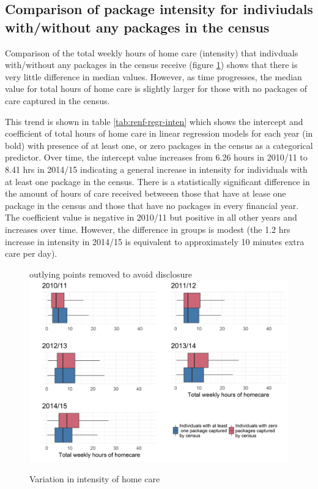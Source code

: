 \documentclass[]{article}
\begin{document}
\subsection{Comparison of package intensity for indiviudals with/without any packages in the census}\label{subsec:renf-inten-diff}

Comparison of the total weekly hours of home care (intensity) that
indivduals with/without any packages in the census receive (figure
\ref{fig:renf-inten}) shows that there is very little difference in
median values. However, as time progresses, the median value for total
hours of home care is slightly larger for those with no packages of care
captured in the census.

This trend is shown in table \ref{tab:renf-regr-inten} which shows the
intercept and coefficient of total hours of home care in linear
regression models for each year (in bold) with presence of at least one,
or zero packages in the census as a categorical predictor. Over time,
the intercept value increases from 6.26 hours in 2010/11 to 8.41 hrs in
2014/15 indicating a general increase in intensity for individuals with
at least one package in the census. There is a statistically significant
difference in the amount of hours of care received betweeen those that
have at lease one package in the census and those that have no packages
in every financial year. The coefficient value is negative in 2010/11
but positive in all other years and increases over time. However, the
difference in groups is modest (the 1.2 hrs increase in intensity in
2014/15 is equivalent to approximately 10 minutes extra care per day).

\begin{figure}[h]
  \centering
    \caption{Variation in intensity of home care}
    {\scriptsize outlying points removed to avoid disclosure}
    \includegraphics{figures/chapter-renf/14-inten.png}
    \label{fig:renf-inten}
\end{figure}
\end{document}
